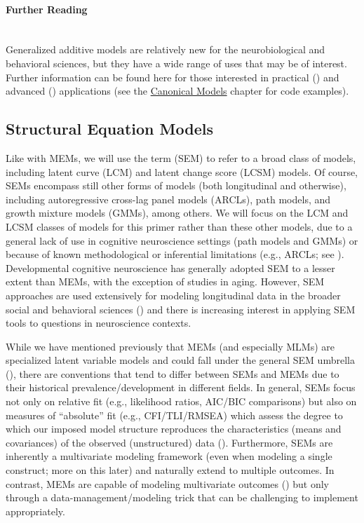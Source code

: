 \documentclass[11pt]{article}
\newcommand{\subsubsubsection}[1]{\paragraph{#1}\mbox{}\\}  %
\begin{document}
\subsubsubsection{Further Reading}
Generalized additive models are relatively new for the neurobiological and behavioral sciences, but they have a wide range of uses that may be of interest. Further information can be found here for those interested in practical (\cite{sorensen_recipe_2021,sullivan_introduction_2015}) and advanced (\cite{berhane_generalized_1998,bringmann_changing_2017,sorensen_meta-analysis_2021}) applications (see the \href{https://e-m-mccormick.github.io/static/longitudinal-primer/02-canonical.html#generalized-additive-mixed-model}{Canonical Models} chapter for code examples).

\subsection{Structural Equation Models} \label{sems}
Like with MEMs, we will use the term  (SEM) to refer to a broad class of models, including latent curve (LCM) and latent change score (LCSM) models. Of course, SEMs encompass still other forms of models (both longitudinal and otherwise), including autoregressive cross-lag panel models (ARCLs), path models, and growth mixture models (GMMs), among others. We will focus on the LCM and LCSM classes of models for this primer rather than these other models, due to a general lack of use in cognitive neuroscience settings (path models and GMMs) or because of known methodological or inferential limitations (e.g., ARCLs; see \cite{curran_separation_2014,hamaker_critique_2015}). Developmental cognitive neuroscience has generally adopted SEM to a lesser extent than MEMs, with the exception of studies in aging. However, SEM approaches are used extensively for modeling longitudinal data in the broader social and behavioral sciences (\cite{bollen_latent_2006,king_longitudinal_2018,mcardle_latent_2009}) and there is increasing interest in applying SEM tools to questions in neuroscience contexts. 

While we have mentioned previously that MEMs (and especially MLMs) are specialized latent variable models and could fall under the general SEM umbrella (\cite{bauer_estimating_2003,curran_have_2003}), there are conventions that tend to differ between SEMs and MEMs due to their historical prevalence/development in different fields. In general, SEMs focus not only on relative fit (e.g., likelihood ratios, AIC/BIC comparisons) but also on measures of “absolute” fit (e.g., CFI/TLI/RMSEA) which assess the degree to which our imposed model structure reproduces the characteristics (means and covariances) of the observed (unstructured) data (\cite{bollen_bic_2014,bollen_bootstrapping_1992,hu_fit_1998,jackson_reporting_2009,mcneish_dynamic_2021,satorra_scaled_2001,widaman_specifying_2003}). Furthermore, SEMs are inherently a multivariate modeling framework (even when modeling a single construct; more on this later) and naturally extend to multiple outcomes. In contrast, MEMs are capable of modeling multivariate outcomes (\cite{curran_multivariate_2023}) but only through a data-management/modeling trick that can be challenging to implement appropriately.
\end{document}
